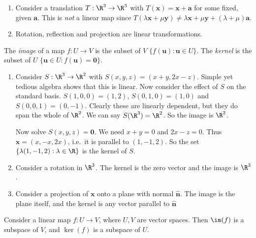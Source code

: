 \documentclass[a4paper]{article}
\begin{document}
\begin{eg}\leavevmode
  \begin{enumerate}
    \item Consider a translation $T:\R^3 \to \R^3$ with $T(\mathbf{x}) = \mathbf{x + a}$ for some fixed, given $\mathbf{a}$. This is \emph{not} a linear map since $T(\lambda\mathbf{x} + \mu\mathbf{y}) \not= \lambda \mathbf{x} + \mu \mathbf{y} + (\lambda + \mu)\mathbf{a}$.
    \item Rotation, reflection and projection are linear transformations.
  \end{enumerate}
\end{eg}

\begin{defi}
  The \emph{image} of a map $f: U\to V$ is the subset of $V$ $\{f(\mathbf{u}): \mathbf{u}\in U\}$. The \emph{kernel} is the subset of $U$ $\{\mathbf{u}\in U: f(\mathbf{u}) = \mathbf{0}\}$.
\end{defi}

\begin{eg}\leavevmode
  \begin{enumerate}
    \item Consider $S: \R^3 \to \R^2$ with $S(x, y, z) = (x + y, 2x - z)$. Simple yet tedious algebra shows that this is linear.
      Now consider the effect of $S$ on the standard basis. $S(1, 0, 0) = (1, 2)$, $S(0, 1, 0) = (1, 0)$ and $S(0, 0, 1) = (0, -1)$. Clearly these are linearly dependent, but they do span the whole of $\R^2$. We can say $S(\R^3) = \R^2$. So the image is $\R^2$.

      Now solve $S(x, y, z) = \mathbf{0}$. We need $x + y = 0$ and $2x - z = 0$. Thus $\mathbf{x} = (x, -x, 2x)$, i.e.\ it is parallel to $(1, -1, 2)$. So the set $\{\lambda(1, -1, 2):\lambda\in \R\}$ is the kernel of $S$.
    \item Consider a rotation in $\R^3$. The kernel is the zero vector and the image is $\R^3$.
    \item Consider a projection of $\mathbf{x}$ onto a plane with normal $\mathbf{\hat n}$. The image is the plane itself, and the kernel is any vector parallel to $\mathbf{\hat n}$
  \end{enumerate}
\end{eg}

\begin{thm}
  Consider a linear map $f: U\to V$, where $U, V$ are vector spaces. Then $\im (f)$ is a subspace of $V$, and $\ker (f)$ is a subspace of $U$.
\end{thm}
\end{document}
